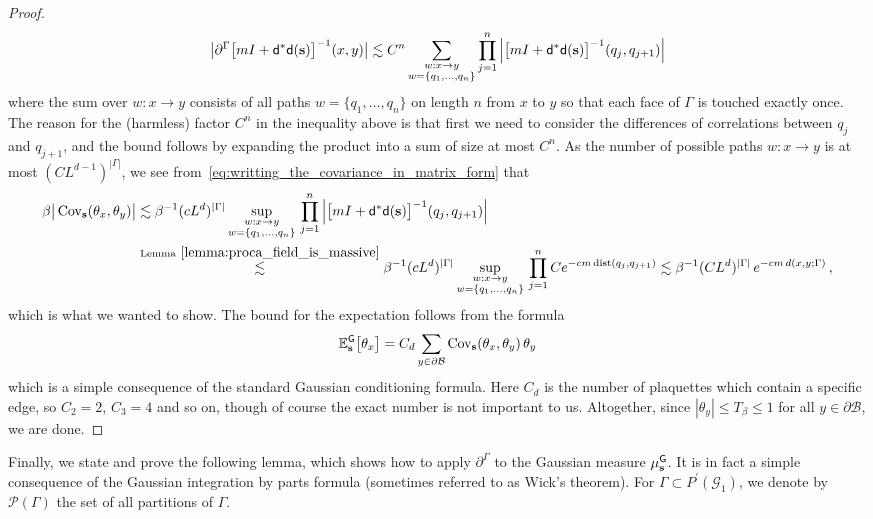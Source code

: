 \documentclass[11pt]{article}
\theoremstyle{definition}
\theoremstyle{remark}
\numberwithin{theorem}{section}
\def\Ga{{\Gamma}}
\newcommand{\bE}{\mathbb E}
\newcommand{\Cov}{\operatorname{Cov}}
\begin{document}
\begin{proof}
         \begin{equation*}
             \big|\partial^\Ga \big[m I + {\sf d}^\ast {\sf d}(\mathbf{s}) \big]^{-1}(x,y)\big| \lesssim C^n \sum_{\substack{w:x\to y \\ w=\{q_1,\ldots,q_n\}}} \prod_{j=1}^{n} \Big| \big[m I + {\sf d}^\ast {\sf d}(\mathbf{s}) \big]^{-1}(q_j,q_{j+1}) \Big| 
         \end{equation*}
         where the sum over $w:x\to y$ consists of all paths $w= \{q_1,\ldots,q_n\}$ on length $n$ from $x$ to $y$ so that each face of $\Ga$ is touched exactly once. The reason for the (harmless) factor $C^n$ in the inequality above is that first we need to consider the  differences of correlations between $q_j$ and $q_{j+1}$, and the bound follows by expanding the product into a sum of size at most $C^n$. As the number of possible paths $w:x\to y$ is at most $(C L^{d-1})^{|\Ga|}$, we see from~\eqref{eq:writting_the_covariance_in_matrix_form} that
         \begin{align*}
            \beta \big|\Cov_{\mathbf{s}}(\theta_x,\theta_y)\big| & \lesssim \beta^{-1} (cL^{d})^{|\Ga|} \sup_{\substack{w:x\to y \\ w =\{q_1,\ldots,q_n\} } }  \, \prod_{j=1}^n\Big| \big[m I + {\sf d}^\ast {\sf d}(\mathbf{s}) \big]^{-1}(q_j,q_{j+1}) \Big| \\ & \stackrel{\text{Lemma}~\ref{lemma:proca_field_is_massive}}{\lesssim}  \beta^{-1} (cL^d)^{|\Ga|} \sup_{\substack{w:x\to y \\ w =\{q_1,\ldots,q_n\} } }  \, \prod_{j=1}^n C e^{-cm \, \text{dist}(q_j,q_{j+1})} \lesssim \beta^{-1} (CL^d)^{|\Ga|} \,  e^{-cm\, d(x,y;\Ga)} \, ,
         \end{align*}
         which is what we wanted to show. The bound for the expectation follows from the formula 
         \[
         \bE_{\mathbf{s}}^{\sf G}\big[\theta_x \big] = C_d \sum_{y\in \partial \mathcal{B}} \Cov_{\mathbf{s}}(\theta_x,\theta_y) \, \theta_y
         \]
         which is a simple consequence of the standard Gaussian conditioning formula. Here $C_d$ is the number of plaquettes which contain a specific edge, so $C_2 = 2$, $C_3 = 4$ and so on, though of course the exact number is not important to us. Altogether, since $|\theta_y| \le T_\beta \le 1$ for all $y\in \partial \mathcal{B}$, we are done. 
    \end{proof}
    Finally, we state and prove the following lemma, which shows how to apply $\partial^\Ga$ to the Gaussian measure $\mu_{\mathbf{s}}^{\sf G}$. It is in fact a simple consequence of the Gaussian integration by parts formula (sometimes referred to as Wick's theorem). For $\Ga\subset P^\prime(\mathcal{G}_1)$, we denote by $\mathcal{P}(\Ga)$ the set of all partitions of $\Ga$. 
\end{document}
